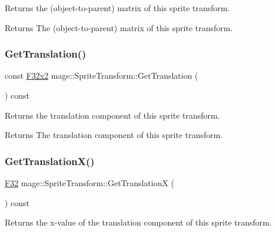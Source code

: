 Returns the (object-\/to-\/parent) matrix of this sprite transform.

\begin{DoxyReturn}{Returns}
The (object-\/to-\/parent) matrix of this sprite transform. 
\end{DoxyReturn}
\hypertarget{classmage_1_1_sprite_transform_a89022e79bd08b6efeb6f660a0da782f0}{}\label{classmage_1_1_sprite_transform_a89022e79bd08b6efeb6f660a0da782f0} 
\subsubsection{\texorpdfstring{Get\+Translation()}{GetTranslation()}}
{\footnotesize\ttfamily const \hyperlink{namespacemage_aa87237ad091f5cd7da612b8523fc108f}{F32x2} mage\+::\+Sprite\+Transform\+::\+Get\+Translation (\begin{DoxyParamCaption}{ }\end{DoxyParamCaption}) const\hspace{0.3cm}{\ttfamily [noexcept]}}

Returns the translation component of this sprite transform.

\begin{DoxyReturn}{Returns}
The translation component of this sprite transform. 
\end{DoxyReturn}
\hypertarget{classmage_1_1_sprite_transform_a27f93a491eed09c33f1ac547df011867}{}\label{classmage_1_1_sprite_transform_a27f93a491eed09c33f1ac547df011867} 
\subsubsection{\texorpdfstring{Get\+Translation\+X()}{GetTranslationX()}}
{\footnotesize\ttfamily \hyperlink{namespacemage_aa97e833b45f06d60a0a9c4fc22ae02c0}{F32} mage\+::\+Sprite\+Transform\+::\+Get\+TranslationX (\begin{DoxyParamCaption}{ }\end{DoxyParamCaption}) const\hspace{0.3cm}{\ttfamily [noexcept]}}

Returns the x-\/value of the translation component of this sprite transform.

